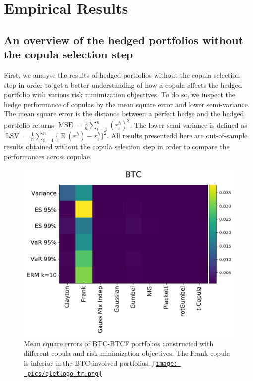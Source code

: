 \section{Empirical Results}\label{sec:results}



\subsection{An overview of the hedged portfolios without the copula selection step}\label{subsec:HP1}
First, we analyse the results of hedged portfolios without the copula
selection step in order to get a better understanding of how a copula
affects the hedged portfolio with various risk minimization
objectives.
To do so, we inspect the hedge performance of copulas by
the mean square error and lower semi-variance.
The mean square error
is the distance between a perfect hedge and the hedged portfolio
returns $\operatorname{MSE}=\frac{1}{n}\sum_{i=1}^n(r^h_i)^2$. 
The lower semi-variance is defined as 
$\operatorname{LSV}=\frac{1}{n}\sum_{i=1}^n\{\operatorname{E}(r^h)-r^h_i\}^2$. 
All results presentedd here are out-of-sample results obtained without
the copula selection step in order to compare the performances across
copulae.  

\begin{figure}[th]
    \centering
    \includegraphics[width=\textwidth]{_pics/MSE_BTC.pdf}
  \caption{Mean square errors of BTC-BTCF portfolios constructed with different copula and risk minimization objectives.
    The Frank copula is inferior in the BTC-involved portfolios.
    \href{http://www.quantlet.com/}{\texttt{[image: \_pics/qletlogo\_tr.png]}} }
\label{fig:MSE_BTC}
\end{figure}

